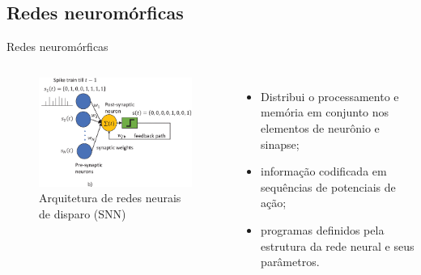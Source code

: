 \subsection{Redes neuromórficas}
\begin{frame}{Redes neuromórficas}
	\begin{columns}[t]
		\column{5cm}
			\begin{figure}[tb]
				\centering
				\caption{Arquitetura de redes neurais de disparo (SNN)}
				\label{fig:snn}
				\includegraphics[width=\linewidth]{figs/snn}
			\end{figure}
		\column{5cm}
			\begin{itemize}
				\item Distribui o processamento e memória em conjunto nos elementos de neurônio e sinapse;
				\item informação codificada em sequências de potenciais de ação;
				\item programas definidos pela estrutura da rede neural e seus parâmetros.
			\end{itemize}
	\end{columns}
\end{frame}

